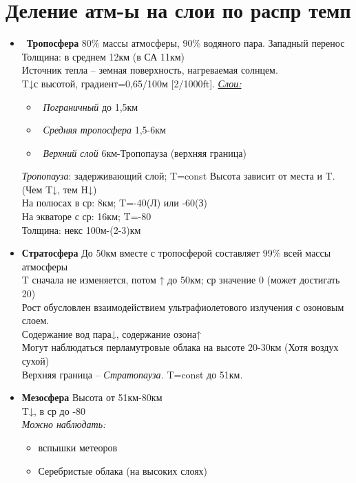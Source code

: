 
\section{Деление атм-ы на слои по распр темп}
\begin{itemize}
	\item\ \textbf{Тропосфера} 	80\% массы атмосферы, 90\% водяного пара. Западный перенос\\
	Толщина: в среднем 12км (в СА 11км)\\
	Источник тепла – земная поверхность, нагреваемая солнцем.\\
	T↓с высотой, градиент=0,65\celsius/100м [2\celsius /1000ft]. \underline{\textit{Слои:}} 	
	\begin{itemize}
		\item\ \textit{Пограничный} 		до 1,5км
		\item\ \textit{Средняя тропосфера} 	1,5-6км
		\item\ \textit{Верхний слой}		6км-Тропопауза (верхняя граница)
	\end{itemize}
	\textit{Тропопауза}: задерживающий слой; T=const
	Высота зависит от места и T. (Чем T↓, тем H↓)\\
	На полюсах в ср: 8км; T=-40\celsius (Л) или -60\celsius (З)\\
	На экваторе с ср: 16км; T=-80\celsius\\
	Толщина: некс 100м-(2-3)км
	\item \textbf{Стратосфера} 	До 50км вместе с тропосферой составляет 99\% всей массы атмосферы\\
	T сначала не изменяется, потом ↑ до 50км; ср значение 0 (может достигать 20\celsius)\\
	Рост обусловлен взаимодействием ультрафиолетового излучения с озоновым слоем.\\
	Содержание вод пара↓, содержание озона↑\\
	Могут наблюдаться перламутровые облака на высоте 20-30км (Хотя воздух сухой)\\
	Верхняя граница – \textit{Стратопауза.} T=const до 51км.\\
	\item \textbf{Мезосфера}
	Высота от 51км-80км\\
	T↓, в ср до -80\celsius\\
	\textit{Можно наблюдать:} 	
	\begin{itemize}
		\item вспышки метеоров
		\item Серебристые облака (на высоких слоях)

\end{itemize}
\end{itemize}

